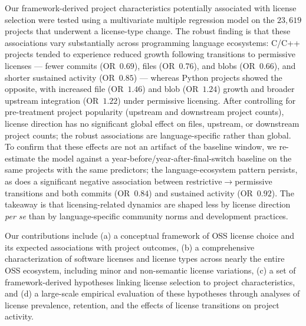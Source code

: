 Our framework-derived project characteristics potentially associated with
license selection were tested using a multivariate multiple regression
model on the $23{,}619$ projects that underwent a license-type change.
The robust finding is that these associations vary substantially across
programming language ecosystems: C/C++ projects tended to experience
reduced growth following transitions to permissive licenses --- fewer
commits (OR~$0.69$), files (OR~$0.76$), and blobs (OR~$0.66$), and
shorter sustained activity (OR~$0.85$) --- whereas Python projects showed
the opposite, with increased file (OR~$1.46$) and blob (OR~$1.24$) growth
and broader upstream integration (OR~$1.22$) under permissive licensing.
After controlling for pre-treatment project popularity (upstream and
downstream project counts), license direction has no significant global
effect on files, upstream, or downstream project counts; the robust
associations are language-specific rather than global. To confirm that
these effects are not an artifact of the baseline window, we re-estimate
the model against a year-before/year-after-final-switch baseline on the
same projects with the same predictors; the language-ecosystem pattern
persists, as does a significant negative association between
restrictive$\rightarrow$permissive transitions and both commits
(OR~$0.84$) and sustained activity (OR~$0.92$). The takeaway is that licensing-related dynamics are shaped
less by license direction \emph{per se} than by language-specific
community norms and development practices.

Our contributions include (a) a conceptual framework of OSS license choice and 
its expected associations with project outcomes, (b) a comprehensive characterization of 
software licenses and license types across nearly the entire OSS ecosystem, 
including minor and non-semantic license variations, (c) a set of framework-derived 
hypotheses linking license selection to project characteristics, and (d) a 
large-scale empirical evaluation of these hypotheses through analyses of license 
prevalence, retention, and the effects of license transitions on project activity.
